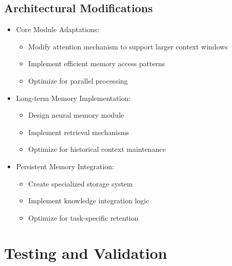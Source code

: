 \documentclass{article}
\begin{document}
\subsection{Architectural Modifications}
\begin{itemize}
    \item Core Module Adaptations:
    \begin{itemize}
        \item Modify attention mechanism to support larger context windows
        \item Implement efficient memory access patterns
        \item Optimize for parallel processing
    \end{itemize}
    \item Long-term Memory Implementation:
    \begin{itemize}
        \item Design neural memory module
        \item Implement retrieval mechanisms
        \item Optimize for historical context maintenance
    \end{itemize}
    \item Persistent Memory Integration:
    \begin{itemize}
        \item Create specialized storage system
        \item Implement knowledge integration logic
        \item Optimize for task-specific retention
    \end{itemize}
\end{itemize}

\section{Testing and Validation}
\end{document}
